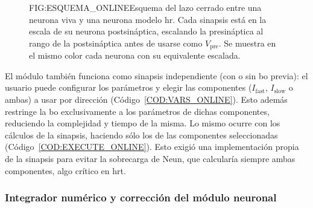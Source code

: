 \begin{figure}[Esquema de la interacción bidireccional biohíbrida en la implementación \textit{online}]{FIG:ESQUEMA_ONLINE}{Esquema del lazo cerrado entre una neurona viva y una neurona modelo \ac{hr}. Cada sinapsis está en la escala de su neurona postsináptica, escalando la presináptica al rango de la postsináptica antes de usarse como \(V_{\mathrm{pre}}\). Se muestra en el mismo color cada neurona con su equivalente escalada.}
\end{figure}

El módulo también funciona como sinapsis independiente (con o sin \ac{bo} previa): el usuario puede configurar los parámetros y elegir las componentes (\(I_{\mathrm{fast}}\), \(I_{\mathrm{slow}}\) o ambas) a usar por dirección (Código~\ref{COD:VARS_ONLINE}). Esto además restringe la \ac{bo} exclusivamente a los parámetros de dichas componentes, reduciendo la complejidad y tiempo de la misma. Lo mismo ocurre con los cálculos de la sinapsis, haciendo sólo los de las componentes seleccionadas (Código~\ref{COD:EXECUTE_ONLINE}). Esto exigió una implementación propia de la sinapsis para evitar la sobrecarga de Neun, que calcularía siempre ambas componentes, algo crítico en \ac{hrt}.

\subsubsection{Integrador numérico y corrección del módulo neuronal\label{SUBSUBSEC:INTEGRAD_NUM_ONLINE_CORRECC_MOD_HR}}

